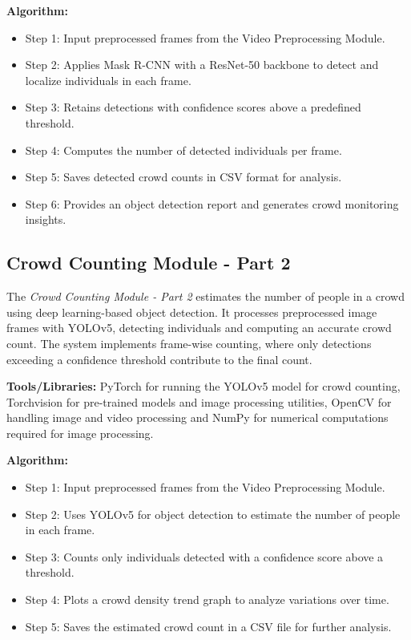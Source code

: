 \documentclass[11pt]{report}
\begin{document}
\textbf{Algorithm:}
\begin{itemize}
  \item Step 1: Input preprocessed frames from the Video Preprocessing Module.
  \item Step 2: Applies Mask R-CNN with a ResNet-50 backbone to detect and localize individuals in each frame.
  \item Step 3: Retains detections with confidence scores above a predefined threshold.
  \item Step 4: Computes the number of detected individuals per frame.
  \item Step 5: Saves detected crowd counts in CSV format for analysis.
  \item Step 6: Provides an object detection report and generates crowd monitoring insights.
\end{itemize}

\subsection{Crowd Counting Module - Part 2}
The \textit{Crowd Counting Module - Part 2} estimates the number of people in a crowd using deep learning-based object detection. It processes preprocessed image frames with YOLOv5, detecting individuals and computing an accurate crowd count. The system implements frame-wise counting, where only detections exceeding a confidence threshold contribute to the final count. 

\textbf{Tools/Libraries:} PyTorch for running the YOLOv5 model for crowd counting, Torchvision for pre-trained models and image processing utilities, OpenCV for handling image and video processing and NumPy for numerical computations required for image processing.

\textbf{Algorithm:}
\begin{itemize}
  \item Step 1: Input preprocessed frames from the Video Preprocessing Module.
  \item Step 2: Uses YOLOv5 for object detection to estimate the number of people in each frame.
  \item Step 3: Counts only individuals detected with a confidence score above a threshold.
  \item Step 4: Plots a crowd density trend graph to analyze variations over time.
  \item Step 5: Saves the estimated crowd count in a CSV file for further analysis.
\end{itemize}
\end{document}

